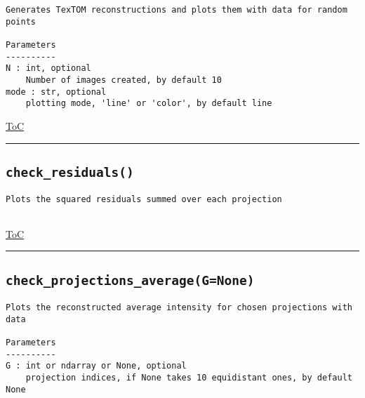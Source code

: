 \documentclass{article}
\begin{document}
\begin{lstlisting}[language=docstring]
Generates TexTOM reconstructions and plots them with data for random points

Parameters
----------
N : int, optional
    Number of images created, by default 10    
mode : str, optional
    plotting mode, 'line' or 'color', by default line
\end{lstlisting}

\begin{flushright}

\hyperref[toc]{ToC}

\end{flushright}



\vspace{5mm}

\hrule

\subsection*{\texttt{check\_residuals()}}
\label{fun:checkresiduals}

\begin{lstlisting}[language=docstring]
Plots the squared residuals summed over each projection
    
\end{lstlisting}

\begin{flushright}

\hyperref[toc]{ToC}

\end{flushright}



\vspace{5mm}

\hrule

\subsection*{\texttt{check\_projections\_average(G=None)}}
\label{fun:checkprojectionsaverage}

\begin{lstlisting}[language=docstring]
Plots the reconstructed average intensity for chosen projections with data

Parameters
----------
G : int or ndarray or None, optional
    projection indices, if None takes 10 equidistant ones, by default None
\end{lstlisting}
\end{document}
